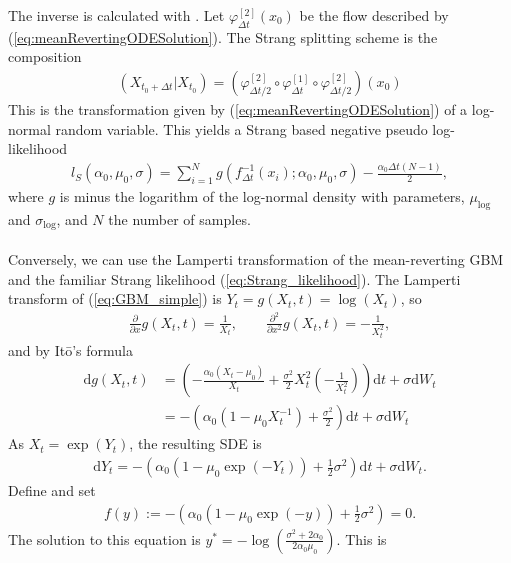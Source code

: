 The inverse is calculated with \cite[remark belown equation (9)]{SplittingSchemes}. Let $\varphi_{\Delta t}^{[2]}(x_0)$ be the flow described by (\ref{eq:meanRevertingODESolution}).
The Strang splitting scheme is the composition
\begin{align}
    \left(X_{t_0 + \Delta t} | X_{t_0}\right) = \left(\varphi_{\Delta t / 2}^{[2]}\circ \varphi_{\Delta t}^{[1]} \circ \varphi_{\Delta t / 2}^{[2]}\right)(x_0)
\end{align}
This is the transformation given by (\ref{eq:meanRevertingODESolution}) of a log-normal random variable. This yields a Strang based negative pseudo log-likelihood
\begin{align}
    l_S(\alpha_0, \mu_0, \sigma) = \sum_{i = 1}^{N} g(f_{\Delta t}^{-1}(x_i); \alpha_0,\mu_0, \sigma) - \frac{\alpha_0\Delta t(N - 1)}{2},
\end{align}
where $g$ is minus the logarithm of the log-normal density with parameters, $\mu_{\mathrm{log}}$ and $\sigma_{\mathrm{log}}$, and $N$ the number of samples.\\\\
Conversely, we can use the Lamperti transformation of the mean-reverting GBM and the familiar Strang likelihood (\ref{eq:Strang_likelihood}). The Lamperti transform of (\ref{eq:GBM_simple}) is $Y_t = g(X_t, t) = \log(X_t)$, so
\begin{align}
    \frac{\partial}{\partial x}g(X_t, t) = \frac{1}{X_t}, \qquad \frac{\partial^2}{\partial x^2}g(X_t, t) = -\frac{1}{X_t^2},
\end{align}
and by Itō's formula
\begin{align}
    \mathrm{d}g(X_t, t) &= \left(-\frac{\alpha_0\left(X_t - \mu_0\right)}{X_t}+\frac{\sigma^2}{2}X_t^2\left(-\frac{1}{X_t^2}\right)\right)\mathrm{d}t + \sigma\mathrm{d}W_t\nonumber\\
    &= -\left(\alpha_0\left(1-\mu_0X_t^{-1}\right) + \frac{\sigma^2}{2}\right)\mathrm{d}t + \sigma\mathrm{d}W_t
\end{align}
As $X_t = \exp(Y_t)$, the resulting SDE is
\begin{align}
    \mathrm{d}Y_t = -\left(\alpha_0\left(1 - \mu_0\exp(-Y_t)\right) + \frac{1}{2}\sigma^2\right)\mathrm{d}t + \sigma \mathrm{d}W_t. \label{eq:GBM_lamperti}
\end{align}
Define and set
\begin{align}
    f(y) := -\left(\alpha_0\left(1 - \mu_0\exp(-y)\right) + \frac{1}{2}\sigma^2\right) = 0.
\end{align}
The solution to this equation is $y^* = -\log\left(\frac{\sigma^2 + 2\alpha_0}{2\alpha_0\mu_0}\right)$. This is
